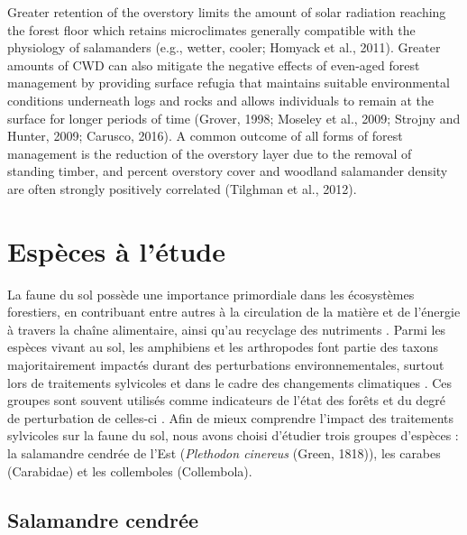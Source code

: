 Greater retention of the overstory limits the amount of solar radiation reaching the forest floor which retains microclimates generally compatible with the physiology of salamanders (e.g., wetter, cooler; Homyack et al., 2011).
Greater amounts of CWD can also mitigate the negative effects of even-aged forest management by providing surface refugia that maintains suitable environmental conditions underneath logs and rocks and allows individuals to remain at the surface for longer periods of time (Grover, 1998; Moseley et al., 2009; Strojny and Hunter, 2009; Carusco, 2016).
A common outcome of all forms of forest management is the reduction of the overstory layer due to the removal of standing timber, and percent overstory cover and woodland salamander density are often strongly positively correlated (Tilghman et al., 2012).


\section*{Espèces à l'étude}
\label{sec:species}

La faune du sol possède une importance primordiale dans les écosystèmes forestiers, en contribuant entre autres à la circulation de la matière et de l'énergie à travers la chaîne alimentaire, ainsi qu'au recyclage des nutriments \citep{Seibold2021contributioninsects,Kudrin2023metaanalysiseffects}.
Parmi les espèces vivant au sol, les amphibiens et les arthropodes font partie des taxons majoritairement impactés durant des perturbations environnementales, 
surtout lors de traitements sylvicoles \citep{Stuart2004Statustrends,Semlitsch2009Effectstimber,Hartshorn2021reviewforest} et dans le cadre des changements climatiques \citep{Alford1999Globalamphibian,Houlahan2000Quantitativeevidence,Pounds2006Widespreadamphibian,Warren2018projectedeffect}. 
Ces groupes sont souvent utilisés comme indicateurs de l'état des forêts et du degré de perturbation de celles-ci \citep{pongeVerticalDistributionCollembola2000,birdChangesSoilLitter2004,Maleque2009Arthropodsbioindicators}.
Afin de mieux comprendre l'impact des traitements sylvicoles sur la faune du sol, nous avons choisi d'étudier trois groupes d'espèces : la salamandre cendrée de l'Est (\textit{Plethodon cinereus} (Green, 1818)), 
les carabes (Carabidae) et les collemboles (Collembola).

\subsection*{Salamandre cendrée}

